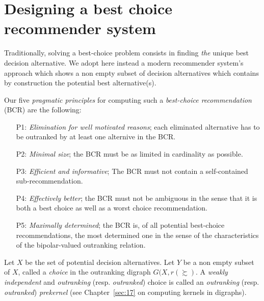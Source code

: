 \section{Designing a best choice recommender system}
\label{sec:4.3}

Traditionally, solving a best-choice problem consists in finding \emph{the} unique best decision alternative. We adopt here instead a modern recommender system’s approach which shows a non empty subset of decision alternatives which contains by construction the potential best alternative(s).

Our five \emph{pragmatic principles} for computing such a \emph{best-choice recommendation} (BCR) are the following:
\begin{itemize}[leftmargin=1cm,listparindent=0em]
\item [P1:] \emph{Elimination for well motivated reasons}; each eliminated alternative has to be outranked by at least one alternive in the BCR.
\item [P2:] \emph{Minimal size}; the BCR must be as limited in cardinality as possible.
\item [P3:] \emph{Efficient and informative}; The BCR must not contain a self-contained sub-recommendation.
\item [P4:] \emph{Effectively better}; the BCR must not be ambiguous in the sense that it is both a best choice as well as a worst choice recommendation.
\item [P5:] \emph{Maximally determined}; the BCR is, of all potential best-choice recommendations, the most determined one in the sense of the characteristics of the bipolar-valued outranking relation.
\end{itemize}

Let $X$ be the set of potential decision alternatives. Let $Y$ be a non empty subset of $X$, called a \emph{choice} in the outranking digraph $G(X,r(\succsim )$. A \emph{weakly independent} and \emph{outranking} (resp. \emph{outranked}) choice is called an \emph{outranking} (resp. \emph{outranked}) \emph{prekernel} (see Chapter~\ref{sec:17} on computing kernels in digraphs).

